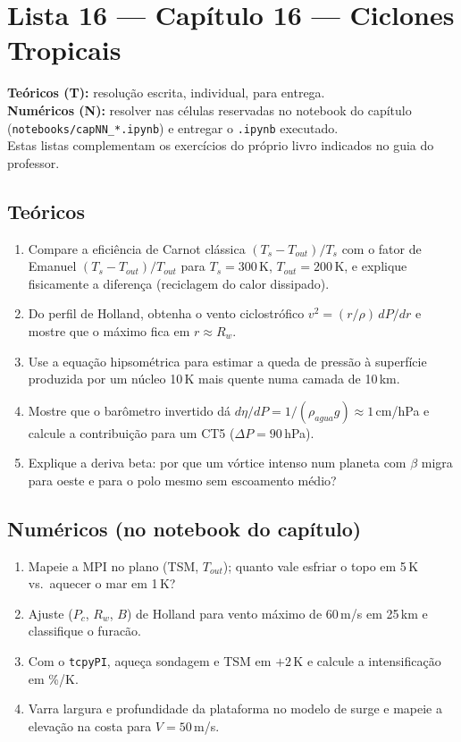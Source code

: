\documentclass[11pt]{article}
\newcommand{\instrucoes}{%
\begin{caixalista}
\textbf{Teóricos (T):} resolução escrita, individual, para entrega.\\
\textbf{Numéricos (N):} resolver nas células reservadas no notebook do
capítulo (\texttt{notebooks/capNN\_*.ipynb}) e entregar o
\texttt{.ipynb} executado.\\
Estas listas complementam os exercícios do próprio livro indicados no
guia do professor.
\end{caixalista}}
\begin{document}
\clearpage
\section*{Lista 16 --- Capítulo 16 --- Ciclones Tropicais}
\instrucoes

\subsection*{Teóricos}

\begin{enumerate}[label=\textbf{T\arabic*.},itemsep=4pt]
  \item Compare a eficiência de Carnot clássica $(T_s-T_{out})/T_s$
        com o fator de Emanuel $(T_s-T_{out})/T_{out}$ para
        $T_s = 300$\,K, $T_{out} = 200$\,K, e explique fisicamente a
        diferença (reciclagem do calor dissipado).
  \item Do perfil de Holland, obtenha o vento ciclostrófico
        $v^2 = (r/\rho)\,dP/dr$ e mostre que o máximo fica em
        $r \approx R_w$.
  \item Use a equação hipsométrica para estimar a queda de pressão à
        superfície produzida por um núcleo 10\,K mais quente numa
        camada de 10\,km.
  \item Mostre que o barômetro invertido dá
        $d\eta/dP = 1/(\rho_{agua}g) \approx 1$\,cm/hPa e calcule a
        contribuição para um CT5 ($\Delta P = 90$\,hPa).
  \item Explique a deriva beta: por que um vórtice intenso num planeta
        com $\beta$ migra para oeste e para o polo mesmo sem
        escoamento médio?
\end{enumerate}

\subsection*{Numéricos (no notebook do capítulo)}

\begin{enumerate}[label=\textbf{N\arabic*.},itemsep=4pt]
  \item Mapeie a MPI no plano (TSM, $T_{out}$); quanto vale esfriar o
        topo em 5\,K vs.\ aquecer o mar em 1\,K?
  \item Ajuste ($P_c$, $R_w$, $B$) de Holland para vento máximo de
        60\,m/s em 25\,km e classifique o furacão.
  \item Com o \texttt{tcpyPI}, aqueça sondagem e TSM em $+2$\,K e
        calcule a intensificação em \%/K.
  \item Varra largura e profundidade da plataforma no modelo de surge
        e mapeie a elevação na costa para $V = 50$\,m/s.
\end{enumerate}
\end{document}
